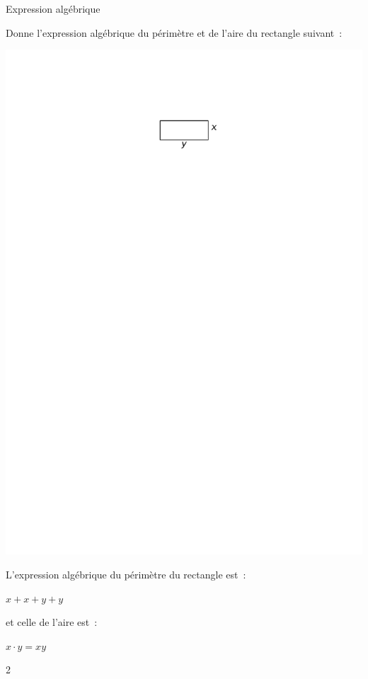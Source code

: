 \documentclass[a4paper,11pt]{report}
\begin{document}
\begin{resolu}{Expression algébrique}
{

	\begin{minipage}[t]{0.5\textwidth}{
	\vspace{0pt}
	Donne l'expression algébrique du périmètre et de l'aire du rectangle suivant~:
	}
	\end{minipage}
	\hfill
	\begin{minipage}[t]{0.4\textwidth}{
	\vspace{0pt}
\includegraphics[scale=1.2]{media/fa-10/rectangle.pdf}
	}
	\end{minipage}\begin{center}	
\end{center}

L'expression algébrique du périmètre du rectangle est~:

$x+x+y+y$

et celle de l'aire est~:

$x \cdot y =xy$
}
{2}
\end{resolu}
\end{document}
